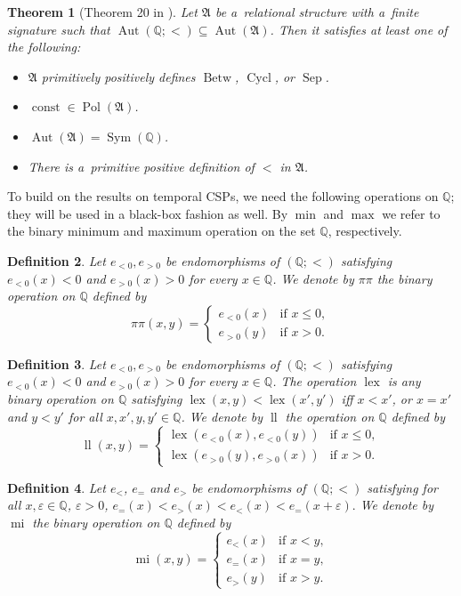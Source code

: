 \documentclass[preprint,12pt]{elsarticle}
\newcommand{\Q}{\mathbb Q}
\newcommand{\bA}{{\mathfrak A}}
\DeclareMathOperator{\Cyc}{Cycl}
\DeclareMathOperator{\Aut}{Aut}
\DeclareMathOperator{\Pol}{Pol}
\DeclareMathOperator{\Sym}{Sym}
\DeclareMathOperator{\mi}{mi}
\DeclareMathOperator{\lele}{ll}
\DeclareMathOperator{\lex}{lex}
\DeclareMathOperator{\const}{const}
\DeclareMathOperator{\Betw}{Betw}
\DeclareMathOperator{\Sep}{Sep}
\newtheorem{theorem}{Theorem}
\newtheorem{definition}[theorem]{Definition}
\begin{document}
\begin{theorem}[Theorem 20 in \cite{tcsps-journal}]\label{thm:def-ord}
Let $\bA$ be a~relational structure with a~finite signature such that $\Aut(\Q;<)\subseteq\Aut(\bA)$. Then it satisfies at least one of the following:
\begin{itemize}
\item $\bA$ primitively positively defines $\Betw$, $\Cyc$, or $\Sep$.
\item $\const \in \Pol(\bA)$.
\item $\Aut(\bA)=\Sym(\Q)$.
\item There is a~primitive positive definition of $<$ in $\bA$.
\end{itemize}
\end{theorem}

To build on the results on temporal CSPs, we need the following operations on $\Q$; they will be used in a black-box fashion as well. 
By $\min$ and $\max$ we refer to the binary minimum and maximum operation on the set $\Q$, respectively. 

\begin{definition}
Let $e_{<0},e_{>0}$ be endomorphisms of $(\mathbb{Q};<)$ satisfying $e_{<0}(x)<0$ and $e_{>0}(x)>0$ for every $x\in \mathbb{Q}$.
%
We denote by $\pi\pi$  the binary operation on $\mathbb{Q}$ defined by 
%
\[\pi\pi(x,y) = \begin{cases}
      e_{<0} (x) &\text{if } x \leq  0, \\
      e_{>0}(y) &\text{if } x > 0.
\end{cases}
\]
\end{definition}

\begin{definition}  \label{def:lex_ll} 
Let $e_{<0},e_{>0}$ be endomorphisms of $(\mathbb{Q};<)$ satisfying $e_{<0}(x)<0$ and $e_{>0}(x)>0$ for every $x\in \mathbb{Q}$.
%
The operation $\lex$ is any binary operation on $ \mathbb{Q}$ satisfying $\lex(x,y) <\lex(x',y')$ iff $x<x'$, or $x=x'$ and $y<y'$ for all $x,x',y,y'\in \mathbb{Q}$.
%
We denote by $\lele$ the operation on $\mathbb{Q}$ defined by 
%
\[\lele(x,y) = \begin{cases}
      \lex(e_{<0}(x),e_{<0}(y)) &\text{if } x \leq  0, \\
      \lex(e_{>0}(y),e_{>0}(x)) &\text{if } x > 0.
\end{cases}
\]
%
\end{definition}

\begin{definition}\label{def:mi}
Let $e_<$, $e_=$ and $e_>$ be endomorphisms of $(\Q;<)$ satisfying
for all $x, \varepsilon \in \Q$, $\varepsilon > 0$,
$e_= (x) < e_{>}(x) < e_{<}(x) < e_{=}(x+\varepsilon).$
We denote by $\mi$  the binary operation on $\Q$ defined by
\[\mi(x,y) = \begin{cases}
      e_{<}(x) &\text{if } x < y, \\
      e_=(x) &\text{if } x = y, \\
      e_>(y) &\text{if } x > y.
\end{cases}
\]
\end{definition}
\end{document}
